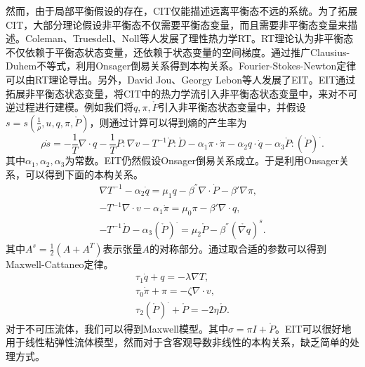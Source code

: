 然而，由于局部平衡假设的存在，CIT仅能描述远离平衡态不远的系统。为了拓展CIT，大部分理论假设非平衡态不仅需要平衡态变量，而且需要非平衡态变量来描述。Coleman、Truesdell、Noll等人发展了理性热力学RT。RT理论认为非平衡态不仅依赖于平衡态状态变量，还依赖于状态变量的空间梯度。通过推广Clausius-Duhem不等式，利用Onsager倒易关系得到本构关系。Fourier-Stokes-Newton定律可以由RT理论导出\cite{jou1996extended}。另外，David Jou、Georgy Lebon等人发展了EIT。EIT通过拓展非平衡态状态变量，将CIT中的热力学流引入非平衡态状态变量中，来对不可逆过程进行建模。例如我们将$q,\pi,\mathring{P}$引入非平衡态状态变量中，并假设$s = s(\frac{1}{\rho}, u,q,\pi,\mathring{P} )$，则通过计算可以得到熵的产生率为
\begin{equation*}
		\rho \dot{s} = - \frac{1}{T} \nabla \cdot q - \frac{1}{T} P: \nabla v - T^{-1} \mathring{P} : \mathring{D} - \alpha_1 \pi \cdot \dot{\pi} - \alpha_2 q \cdot \dot{q} - \alpha_3 \mathring{P} : ({\mathring{P} })^. .
\end{equation*}
其中$\alpha_1,\alpha_2,\alpha_3$为常数。EIT仍然假设Onsager倒易关系成立。于是利用Onsager关系，可以得到下面的本构关系。
\begin{subequations} \label{eq:EITconstitutive}
		\begin{align}
	\nabla T^{-1} - \alpha_2 \dot{q} = \mu_1 q - \beta^{''}\nabla \cdot \dot{P} - \beta' \nabla \pi, \\
	-T^{-1} \nabla \cdot v - \alpha_1 \dot{\pi} = \mu_0 \pi - \beta' \nabla \cdot q , \\
	-T^{-1} \mathring{D} - \alpha_3 (\mathring{P})^. = \mu_2 \mathring{P} - \beta^{''} (\mathring{\nabla q})^s. 
		\end{align}
\end{subequations}
其中$A^s = \frac{1}{2} (A+A^T)$表示张量$A$的对称部分。通过取合适的参数可以得到Maxwell-Cattaneo定律。
\begin{eqnarray*}
	\tau_1 \dot{q} + q = - \lambda \nabla T, \\
 	\tau_0 \dot{\pi } + \pi = -\zeta \nabla \cdot v, \\
 	\tau_2 (\mathring{P})^. + \mathring{P} = -2 \eta \mathring{D}.
\end{eqnarray*}
对于不可压流体，我们可以得到Maxwell模型。其中$\sigma = \pi I + \mathring{P} $。EIT可以很好地用于线性粘弹性流体模型，然而对于含客观导数非线性的本构关系，缺乏简单的处理方式\cite{jou1996extended}。

